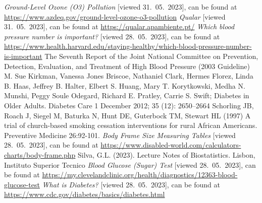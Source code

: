 \documentclass{article}
\begin{document}
\begin{thebibliography}{99}
   \emph{Ground-Level Ozone (O3) Pollution}
   [viewed 31.~05.~2023], can be found at 
   \url{https://www.azdeq.gov/ground-level-ozone-o3-pollution} 
    \emph{Qualar}
   [viewed 31.~05.~2023], can be found at 
   \url{https://qualar.apambiente.pt/} 
   \emph{Which blood pressure number is important?}
   [viewed 28.~05.~2023], can be found at   
   \url{https://www.health.harvard.edu/staying-healthy/which-blood-pressure-number-is-important} 
   The Seventh Report of the Joint National Committee on Prevention, Detection, Evaluation, and Treatment of High Blood Pressure (2003 Guideline)
   M. Sue Kirkman, Vanessa Jones Briscoe, Nathaniel Clark, Hermes Florez, Linda B. Haas, Jeffrey B. Halter, Elbert S. Huang, Mary T. Korytkowski, Medha N. Munshi, Peggy Soule Odegard, Richard E. Pratley, Carrie S. Swift; Diabetes in Older Adults. Diabetes Care 1 December 2012; 35 (12): 2650–2664
   Schorling JB, Roach J, Siegel M, Baturka N, Hunt DE, Guterbock TM, Stewart HL (1997) A trial of church-based smoking cessation interventions for rural African Americans. Preventive Medicine 26:92-101.
   \emph{Body Frame Size Measuring Tables}
   [viewed 28.~05.~2023], can be found at   
   \url{https://www.disabled-world.com/calculators-charts/body-frame.php}
    Silva, G.L. (2023). Lecture Notes of Biostatistics. Lisbon, Instituto Superior Tecnico
   \emph{Blood Glucose (Sugar) Test}
   [viewed 28.~05.~2023], can be found at       
    \url{https://my.clevelandclinic.org/health/diagnostics/12363-blood-glucose-test}
    \emph{What is Diabetes?}
   [viewed 28.~05.~2023], can be found at       
    \url{https://www.cdc.gov/diabetes/basics/diabetes.html}

\end{thebibliography}
\end{document}
